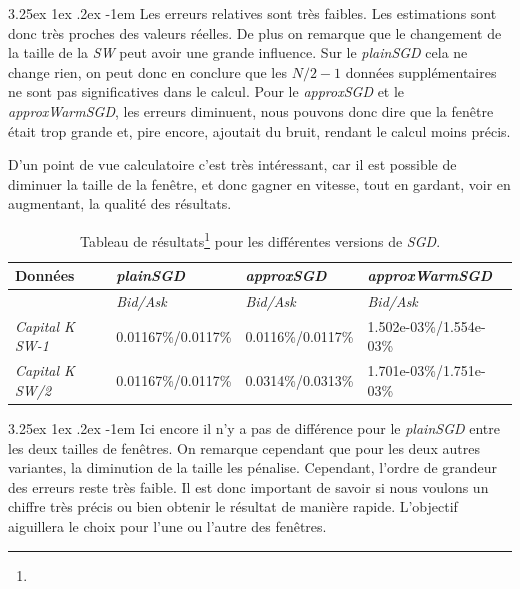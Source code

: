 \documentclass[a4paper, 11pt]{article}
\makeatletter
\renewcommand\paragraph{\@startsection{paragraph}{5}{\z@}%
  {3.25ex \@plus1ex \@minus.2ex}%
  {-1em}%
  {\normalfont\normalsize\bfseries}}
\makeatother
\begin{document}
 \addtocounter{footnote}{-2} %



\paragraph{}
Les erreurs relatives sont très faibles. Les estimations sont donc très proches des valeurs réelles. De plus on remarque que le  changement de la taille de la \textit{SW} peut avoir une grande influence. Sur le \textit{plainSGD} cela ne change rien, on peut donc en conclure que les $N/2 - 1$ données supplémentaires ne sont pas significatives dans le calcul. Pour le \textit{approxSGD} et le \textit{approxWarmSGD}, les erreurs diminuent, nous pouvons donc dire que la fenêtre était trop grande et, pire encore, ajoutait du bruit, rendant le calcul moins précis.

D'un point de vue calculatoire c'est très intéressant, car il est possible de diminuer la taille de la fenêtre, et donc gagner en vitesse, tout en gardant, voir en augmentant, la qualité des résultats.


\begin{table}[H]
	\centering
\begin{tabular}{|l|l|l|l|}
	\hline
	Données & \textit{plainSGD} & \textit{approxSGD} & \textit{approxWarmSGD}\\
	\hline
	\ & \textit{Bid/Ask} & \textit{Bid/Ask} & \textit{Bid/Ask} \\
	\hline
	\textit{Capital K SW-1} & 0.01167\%/0.0117\% & 0.0116\%/0.0117\% & 1.502e-03\%/1.554e-03\% \\
	\hline
	\textit{Capital K SW/2} & 0.01167\%/0.0117\% & 0.0314\%/0.0313\% & 1.701e-03\%/1.751e-03\%\\
	\hline

\end{tabular}
\caption[]{Tableau de résultats\footnote{} pour les différentes versions de \textit{SGD}.}
\end{table}


\paragraph{}
Ici encore il n'y a pas de différence pour le \textit{plainSGD} entre les deux tailles de fenêtres. On remarque cependant que pour les deux autres variantes, la diminution de la taille les pénalise. Cependant, l'ordre de grandeur des erreurs reste très faible. Il est donc important de savoir si nous voulons un chiffre très précis ou bien obtenir le résultat de manière rapide. L'objectif aiguillera le choix pour l'une ou l'autre des fenêtres.
\end{document}

